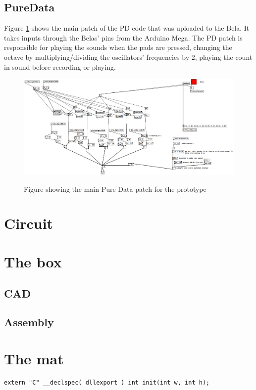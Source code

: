 	\subsection{PureData}%
	Figure \ref{fig:pdPatch} shows the main patch of the PD code that was uploaded to the Bela. It takes inputs through the Belas' pins from the Arduino Mega. The PD patch is responsible for playing the sounds when the pads are pressed, changing the octave by multiplying/dividing the oscillators' frequencies by 2, playing the count in sound before recording or playing.
	
	\begin{figure}[H]
		\centering
		\includegraphics[width=1\linewidth]{figure/Implementation/pdPatch}
		\label{fig:pdPatch}
		\caption{Figure showing the main Pure Data patch for the prototype}
	\end{figure}	
	
\section{Circuit}


\section{The box}%

	\subsection{CAD}
		
	\subsection{Assembly}

\section{The mat}%

\begin{listing}[H]
	\caption{Example 1}
	\label{listing:example1}
	\begin{verbatim}
extern "C" __declspec( dllexport ) int init(int w, int h);
	\end{verbatim}
\end{listing}